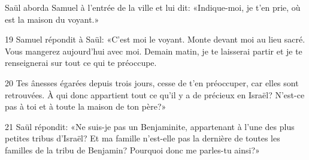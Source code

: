 Saül aborda Samuel à l’entrée de la ville et lui dit: «Indique-moi, je t’en prie, où est la maison du voyant.»

19 Samuel répondit à Saül: «C’est moi le voyant. Monte devant moi au lieu sacré. Vous mangerez aujourd’hui avec moi. Demain matin, je te laisserai partir et je te renseignerai sur tout ce qui te préoccupe.

20 Tes ânesses égarées depuis trois jours, cesse de t’en préoccuper, car elles sont retrouvées. À qui donc appartient tout ce qu’il y a de précieux en Israël? N’est-ce pas à toi et à toute la maison de ton père?»

21 Saül répondit: «Ne suis-je pas un Benjaminite, appartenant à l’une des plus petites tribus d’Israël? Et ma famille n’est-elle pas la dernière de toutes les familles de la tribu de Benjamin? Pourquoi donc me parles-tu ainsi?»
